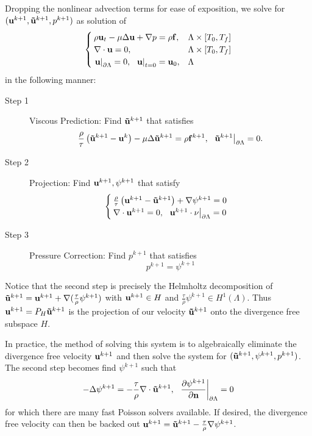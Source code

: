 \documentclass[letterpaper]{erdc}
\begin{document}
Dropping the nonlinear advection terms for ease of exposition, we solve for $(\textbf{u}^{k+1}, \mathbf{\tilde{u}}^{k+1}, p^{k+1})$ as solution of 
\begin{equation}
\begin{cases}
  \rho\textbf{u}_t - \mu\Delta\textbf{u} + \nabla p = \rho\mathbf{f},& \Lambda\times[T_0,T_f]\\
  \nabla\cdot \textbf{u} = 0,& \Lambda\times[T_0,T_f]\\
  \left.\textbf{u}\right|_{\partial\Lambda} = 0,\hspace{2mm} \left.\textbf{u}\right|_{t=0} = \textbf{u}_0,& \Lambda
\end{cases}
\end{equation}
in the following manner:
\begin{description}
  \item[Step 1] Viscous Prediction:  Find $\mathbf{\tilde{u}}^{k+1}$ that satisfies
  \begin{equation}
    \frac{\rho}{\tau}\left(\mathbf{\tilde{u}}^{k+1} - \textbf{u}^{k} \right) - \mu \Delta \mathbf{\tilde{u}}^{k+1} = \rho\mathbf{f}^{k+1},  \hspace{2mm} \left.\mathbf{\tilde{u}}^{k+1}\right|_{\partial\Lambda} = 0.
  \end{equation}
  
  \item[Step 2] Projection:  Find $\textbf{u}^{k+1}, \psi^{k+1}$ that satisfy
  \begin{equation}
    \begin{cases}
    \frac{\rho}{\tau}\left(\textbf{u}^{k+1} - \mathbf{\tilde{u}}^{k+1} \right) + \nabla \psi^{k+1} = 0 \\
    \nabla\cdot \textbf{u}^{k+1} = 0, \hspace{2mm} \left.\textbf{u}^{k+1}\cdot\nu\right|_{\partial\Lambda} = 0
    \end{cases}
  \end{equation}
  
  \item[Step 3] Pressure Correction: Find $p^{k+1}$ that satisfies
  \begin{equation}
    p^{k+1} = \psi^{k+1}
  \end{equation} 
\end{description}

Notice that the second step is precisely the Helmholtz decomposition of $\mathbf{\tilde{u}}^{k+1} = \textbf{u}^{k+1} + \nabla(\frac{\tau}{\rho} \psi^{k+1})$ with $\textbf{u}^{k+1}\in H$ and $\frac{\tau}{\rho}\psi^{k+1}\in H^1(\Lambda)$.  Thus $\textbf{u}^{k+1} = P_{H}\mathbf{\tilde{u}}^{k+1}$ is the projection of our velocity $\mathbf{\tilde{u}}^{k+1}$ onto the divergence free subspace $H$.

In practice, the method of solving this system is to algebraically eliminate the divergence free velocity $\textbf{u}^{k+1}$ and then solve the system for $(\mathbf{\tilde{u}}^{k+1},\psi^{k+1}, p^{k+1})$.  The second step becomes find $\psi^{k+1}$ such that
\begin{equation}
  -\Delta\psi^{k+1} = -\frac{\tau}{\rho} \nabla\cdot \mathbf{\tilde{u}}^{k+1}, \hspace{2mm} \left.\frac{\partial \psi^{k+1}}{\partial\textbf{n}}\right|_{\partial\Lambda} = 0
\end{equation}
for which there are many fast Poisson solvers available. If desired, the divergence free velocity can then be backed out $\textbf{u}^{k+1} = \mathbf{\tilde{u}}^{k+1} -\frac{\tau}{\rho} \nabla\psi^{k+1}$.
\end{document}
